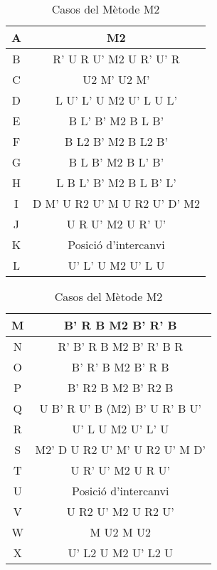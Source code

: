 \begin{table}[h]
    \begin{minipage}{.5\linewidth}
        \centering
        \begin{tabular}{|c|c|}
            \hline
            A & M2 \\
            \hline
            B & R' U R U' M2 U R' U' R \\
            \hline
            C & U2 M' U2 M' \\
            \hline
            D & L U' L' U M2 U' L U L'  \\
            \hline
            E & B L' B' M2 B L B'  \\
            \hline
            F & B L2 B' M2 B L2 B' \\
            \hline
            G & B L B' M2 B L' B' \\
            \hline
            H & L B L' B' M2 B L B' L' \\
            \hline
            I & D M' U R2 U' M U R2 U' D' M2 \\
            \hline
            J & U R U' M2 U R' U' \\
            \hline
            K & Posició d'intercanvi \\
            \hline
            L & U' L' U M2 U' L U \\
            \hline 
        \end{tabular}
    \end{minipage}
    \begin{minipage}{.5\linewidth}
        \centering
        \begin{tabular}{|c|c|}
            \hline
             M & B' R B M2 B' R' B \\
             \hline
             N & R' B' R B M2 B' R' B R  \\
             \hline
             O & B' R' B M2 B' R B \\
             \hline
             P & B' R2 B M2 B' R2 B \\
             \hline
             Q & U B' R U' B (M2) B' U R' B U' \\
             \hline
             R & U' L U M2 U' L' U \\
             \hline
             S & M2' D U R2 U' M' U R2 U' M D' \\
             \hline
             T & U R' U' M2 U R U'  \\
             \hline
             U & Posició d'intercanvi \\
             \hline
             V & U R2 U' M2 U R2 U' \\
             \hline
             W & M U2 M U2  \\
             \hline
             X & U' L2 U M2 U' L2 U \\
             \hline 
        \end{tabular}
    \end{minipage} 
    \caption{Casos del Mètode M2}
    \label{fig:taula-m2}
\end{table}


